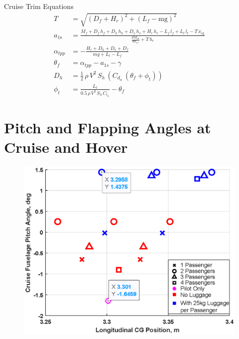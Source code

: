 \documentclass[11pt,a4paper]{article}
\begin{document}
\begin{appendices}
Cruise Trim Equations
\begin{align}
    T&=\sqrt{{\left(D_{f}+H_{r}\right)}^2+{\left(L_{f}-\mathrm{mg}\right)}^2}\\
    a_{\mathrm{1s}}&=\frac{M_{f}+D_{f}\,h_{f}+D_{h}\,h_{h}+D_{v}\,h_{v}+H_{r}\,h_{r}-L_{f}\,l_{f}+L_{t}\,l_{t}-T\,x_{\mathrm{cg}}}{\frac{dM_m}{da_{1s}}+T\,h_{r}}\\
    \alpha_{tpp}&=-\frac{H_r+D_h+D_v+D_f}{mg+L_t-L_f}\\
    \theta_f&=\alpha_{tpp}-a_{1s}-\gamma\\
    D_h&=\frac{1}{2}\,\rho\,V^2\,S_h\,(C_{d_\alpha}\,(\theta_f+\phi_t))\\
    \phi_t&=\frac{L_t}{0.5\,\rho\,V^2\,S_h\,C_{l_\alpha}}-\theta_f
\end{align}{}
%
%
\section{Pitch and Flapping Angles at Cruise and Hover}
\renewcommand\thefigure{D.\arabic{figure}}  
\setcounter{figure}{0}
\renewcommand\theequation{D.\arabic{equation}}  
\setcounter{equation}{0}
\renewcommand\thetable{D.\arabic{table}}  
\setcounter{table}{0}
\begin{figure}[H]
\centering
\begin{minipage}{.49\textwidth}
  \centering
  \includegraphics[width=\linewidth]{CGCRUISEP.eps}
  \label{fig:CGCRUISEP}
\end{minipage}\hspace{0.2cm}

\end{figure}
\end{appendices}
\end{document}
